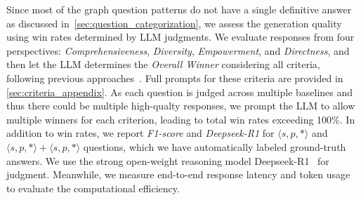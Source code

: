  Since most of the graph question patterns do not have a single definitive answer as discussed in~\autoref{sec:question_categorization}, we assess the generation quality using win rates determined by LLM judgments. We evaluate responses from four perspectives: \textit{Comprehensiveness}, \textit{Diversity}, \textit{Empowerment}, and \textit{Directness}, and then let the LLM determines the \textit{Overall Winner} considering all criteria, following previous approaches~\cite{ms_graphrag, lightrag}. Full prompts for these criteria are provided in \autoref{sec:criteria_appendix}. As each question is judged across multiple baselines and thus there could be multiple high-qualty responses, we prompt the LLM to allow multiple winners for each criterion, leading to total win rates exceeding 100\%. In addition to win rates, we report \textit{F1-score} and \textit{Deepseek-R1} for $\langle s, p, * \rangle$ and $\langle s, p, * \rangle+ \langle s, p, * \rangle$ questions, which we have automatically labeled ground-truth answers. We use the strong open-weight reasoning model Deepseek-R1~\cite{deepseekr1} for judgment. Meanwhile, we measure end-to-end response latency and token usage to evaluate the computational efficiency.